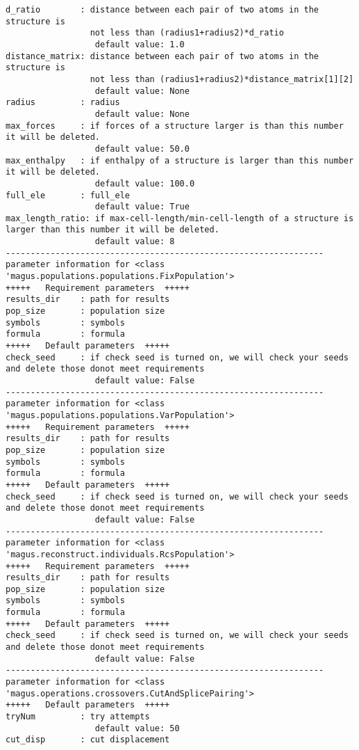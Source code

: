 \documentclass[12pt,oneside]{book}
\begin{document}
\begin{tcolorbox}
\begin{verbatim}
d_ratio        : distance between each pair of two atoms in the structure is
                 not less than (radius1+radius2)*d_ratio
                  default value: 1.0
distance_matrix: distance between each pair of two atoms in the structure is
                 not less than (radius1+radius2)*distance_matrix[1][2]
                  default value: None
radius         : radius
                  default value: None
max_forces     : if forces of a structure larger is than this number it will be deleted.
                  default value: 50.0
max_enthalpy   : if enthalpy of a structure is larger than this number it will be deleted.
                  default value: 100.0
full_ele       : full_ele
                  default value: True
max_length_ratio: if max-cell-length/min-cell-length of a structure is larger than this number it will be deleted.
                  default value: 8
----------------------------------------------------------------
parameter information for <class 'magus.populations.populations.FixPopulation'>
+++++	Requirement parameters	+++++
results_dir    : path for results
pop_size       : population size
symbols        : symbols
formula        : formula
+++++	Default parameters	+++++
check_seed     : if check seed is turned on, we will check your seeds and delete those donot meet requirements
                  default value: False
----------------------------------------------------------------
parameter information for <class 'magus.populations.populations.VarPopulation'>
+++++	Requirement parameters	+++++
results_dir    : path for results
pop_size       : population size
symbols        : symbols
formula        : formula
+++++	Default parameters	+++++
check_seed     : if check seed is turned on, we will check your seeds and delete those donot meet requirements
                  default value: False
----------------------------------------------------------------
parameter information for <class 'magus.reconstruct.individuals.RcsPopulation'>
+++++	Requirement parameters	+++++
results_dir    : path for results
pop_size       : population size
symbols        : symbols
formula        : formula
+++++	Default parameters	+++++
check_seed     : if check seed is turned on, we will check your seeds and delete those donot meet requirements
                  default value: False
----------------------------------------------------------------
parameter information for <class 'magus.operations.crossovers.CutAndSplicePairing'>
+++++	Default parameters	+++++
tryNum         : try attempts
                  default value: 50
cut_disp       : cut displacement

\end{verbatim}
\end{tcolorbox}
\end{document}
